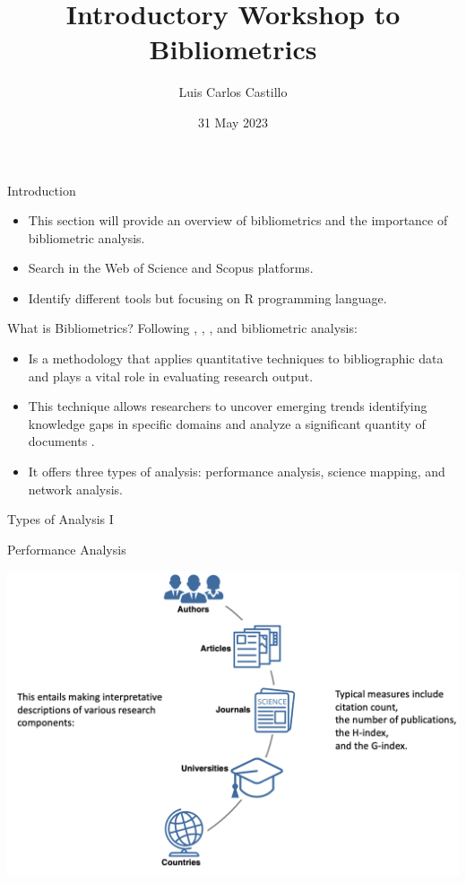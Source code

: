 \documentclass[
  ignorenonframetext,
]{beamer}
\title{Introductory Workshop to Bibliometrics}
\author{Luis Carlos Castillo}
\date{31 May 2023}
\institute{University of Urbino\\
Ph.D.~Program in Global Studies}
\providecommand{\tightlist}{%
  \setlength{\itemsep}{0pt}\setlength{\parskip}{0pt}}
\begin{document}
\frame{\titlepage}

\begin{frame}{Introduction}
\protect\hypertarget{introduction}{}
\begin{itemize}
\item
  This section will provide an overview of bibliometrics and the
  importance of bibliometric analysis.
\item
  Search in the Web of Science and Scopus platforms.
\item
  Identify different tools but focusing on R programming language.
\end{itemize}
\end{frame}

\begin{frame}{What is Bibliometrics?}
\protect\hypertarget{what-is-bibliometrics}{}
Following \citet{donthu2021}, \citet{ellegaard2015}, \citet{Aria2017},
and \citet{bornmann2015} bibliometric analysis:

\begin{itemize}
\tightlist
\item
  Is a methodology that applies quantitative techniques to bibliographic
  data and plays a vital role in evaluating research output.
\item
  This technique allows researchers to uncover emerging trends
  identifying knowledge gaps in specific domains and analyze a
  significant quantity of documents .
\item
  It offers three types of analysis: performance analysis, science
  mapping, and network analysis.
\end{itemize}
\end{frame}

\begin{frame}{Types of Analysis I}
\protect\hypertarget{types-of-analysis-i}{}
\begin{block}{Performance Analysis}
\protect\hypertarget{performance-analysis}{}
\begin{center}
\includegraphics[width=1\textwidth]{pic_1.png}
\end{center}
\end{block}
\end{frame}
\end{document}
